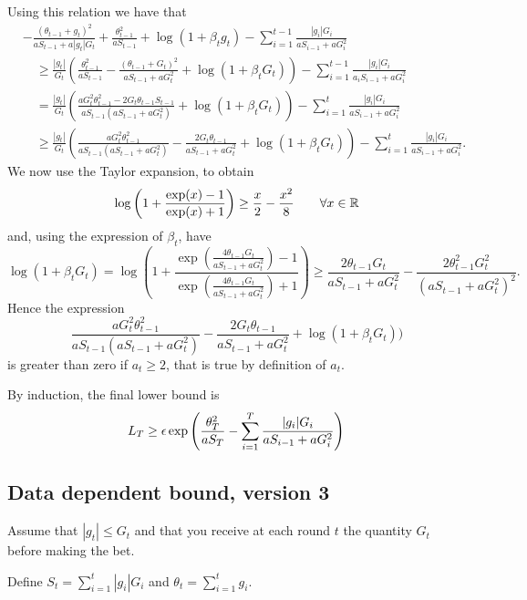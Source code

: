 Using this relation we have that
\begin{align}
&-\frac{(\theta_{t-1}+g_t)^2}{a S_{t-1}+a |g_t| G_t} + \frac{\theta_{t-1}^2}{a S_{t-1}}+\log(1+\beta_t g_t)-\sum_{i=1}^{t-1} \frac{|g_i| G_i}{a S_{i-1} + a G^2_i} \\
&\quad \geq \frac{|g_t|}{G_t} (\frac{\theta_{t-1}^2}{a S_{t-1}} - \frac{(\theta_{t-1}+G_t)^2}{a S_{t-1} + a G^2_t} + \log(1+\beta_t G_t)) - \sum_{i=1}^{t-1} \frac{|g_i| G_i}{a_i S_{i-1} + a G^2_i}\\
&\quad = \frac{|g_t|}{G_t} (\frac{a G^2_t \theta_{t-1}^2 -2 G_t \theta_{t-1} S_{t-1} }{a S_{t-1}(a S_{t-1} + a G^2_t)} + \log(1+\beta_t G_t)) - \sum_{i=1}^{t} \frac{|g_i|G_i}{a S_{i-1} + a G^2_i}\\
&\quad \geq \frac{|g_t|}{G_t} (\frac{a G^2_t \theta_{t-1}^2}{a S_{t-1}(a S_{t-1} + a G^2_t)}-\frac{2 G_t \theta_{t-1}}{a S_{t-1} + a G^2_t} + \log(1+\beta_t G_t)) - \sum_{i=1}^{t} \frac{|g_i| G_i}{a S_{i-1} + a G^2_i}.
\end{align}
We now use the Taylor expansion, to obtain
\[
\log\left(1+\frac{\exp(x)-1}{\exp(x)+1}\right) \geq \frac{x}{2} -\frac{x^2}{8} \qquad \forall x \in \mathbb{R}
\]
and, using the expression of $\beta_t$, have
\[
\log\left(1+\beta_t G_t\right) 
= \log\left(1+\frac{\exp\left(\frac{4 \theta_{t-1} G_t}{a S_{t-1} + a G^2_t}\right)-1}{\exp\left(\frac{4 \theta_{t-1} G_t}{a S_{t-1} + a G^2_t}\right)+1}\right) 
\geq \frac{2 \theta_{t-1} G_t}{a S_{t-1} + a G^2_t} -\frac{2 \theta_{t-1}^2 G_t^2}{(a S_{t-1} + a G^2_t)^2}.
\]
Hence the expression 
\[
\frac{a G^2_t \theta_{t-1}^2}{a S_{t-1}(a S_{t-1} + a G_t^2)}-\frac{2 G_t \theta_{t-1}}{a S_{t-1} + a G^2_t} + \log(1+\beta_t G_t))
\]
is greater than zero if $a_t \geq 2$, that is true by definition of $a_t$.

By induction, the final lower bound is 
\[
L_{T} \geq \epsilon \exp\left(\frac{\theta_{T}^2}{a S_{T}} - \sum_{i=1}^{T} \frac{|g_i| G_i}{a S_{i-1} + a G^2_i} \right) \\
\]


\subsection{Data dependent bound, version 3}

Assume that $|g_t|\leq G_t$ and that you receive at each round $t$ the quantity $G_t$ before making the bet.

Define $S_t = \sum_{i=1}^t |g_i| G_i$ and $\theta_t=\sum_{i=1}^t g_i$.

